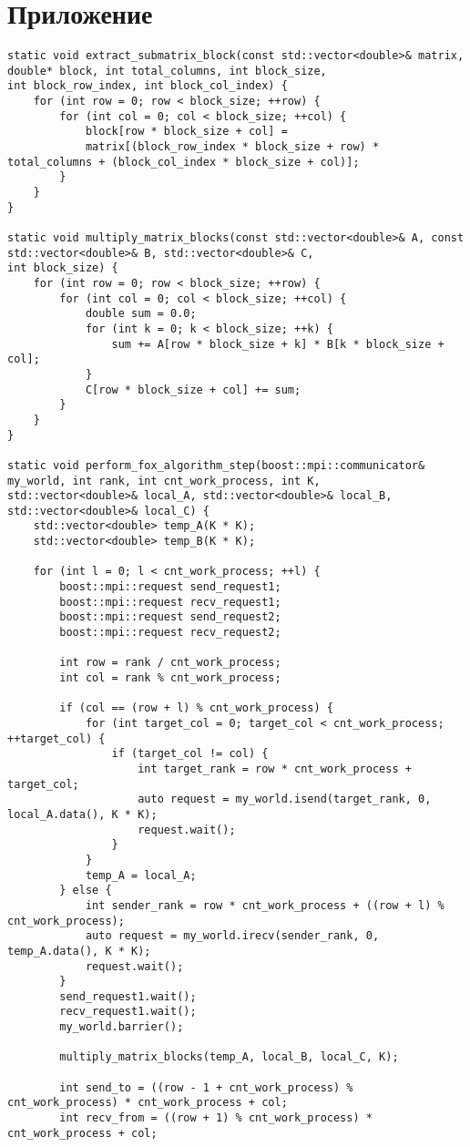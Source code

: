 \documentclass{report}
\begin{document}
\section*{Приложение}
\begin{lstlisting}
static void extract_submatrix_block(const std::vector<double>& matrix, double* block, int total_columns, int block_size,
int block_row_index, int block_col_index) {
	for (int row = 0; row < block_size; ++row) {
		for (int col = 0; col < block_size; ++col) {
			block[row * block_size + col] =
			matrix[(block_row_index * block_size + row) * total_columns + (block_col_index * block_size + col)];
		}
	}
}

static void multiply_matrix_blocks(const std::vector<double>& A, const std::vector<double>& B, std::vector<double>& C,
int block_size) {
	for (int row = 0; row < block_size; ++row) {
		for (int col = 0; col < block_size; ++col) {
			double sum = 0.0;
			for (int k = 0; k < block_size; ++k) {
				sum += A[row * block_size + k] * B[k * block_size + col];
			}
			C[row * block_size + col] += sum;
		}
	}
}

static void perform_fox_algorithm_step(boost::mpi::communicator& my_world, int rank, int cnt_work_process, int K,
std::vector<double>& local_A, std::vector<double>& local_B,
std::vector<double>& local_C) {
	std::vector<double> temp_A(K * K);
	std::vector<double> temp_B(K * K);
	
	for (int l = 0; l < cnt_work_process; ++l) {
		boost::mpi::request send_request1;
		boost::mpi::request recv_request1;
		boost::mpi::request send_request2;
		boost::mpi::request recv_request2;
		
		int row = rank / cnt_work_process;
		int col = rank % cnt_work_process;
		
		if (col == (row + l) % cnt_work_process) {
			for (int target_col = 0; target_col < cnt_work_process; ++target_col) {
				if (target_col != col) {
					int target_rank = row * cnt_work_process + target_col;
					auto request = my_world.isend(target_rank, 0, local_A.data(), K * K);
					request.wait();
				}
			}
			temp_A = local_A;
		} else {
			int sender_rank = row * cnt_work_process + ((row + l) % cnt_work_process);
			auto request = my_world.irecv(sender_rank, 0, temp_A.data(), K * K);
			request.wait();
		}
		send_request1.wait();
		recv_request1.wait();
		my_world.barrier();
		
		multiply_matrix_blocks(temp_A, local_B, local_C, K);
		
		int send_to = ((row - 1 + cnt_work_process) % cnt_work_process) * cnt_work_process + col;
		int recv_from = ((row + 1) % cnt_work_process) * cnt_work_process + col;
		

\end{lstlisting}
\end{document}
